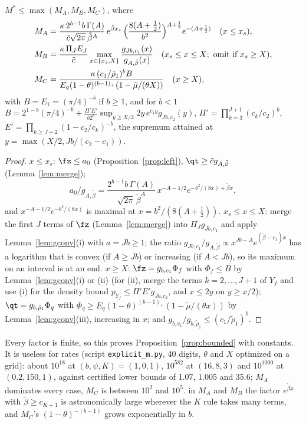 \begin{proposition}\label{prop:explicit}
$M^*\le\max(M_A,M_B,M_C)$, where
\begin{align*}
M_A&=\frac{\kappa\,2^{b-1}b\,\Gamma(A)}{\tilde c\sqrt{2\pi}\,\tilde\beta^A}\,e^{\tilde\beta x_s}\,
\Bigl(\frac{8(A+\frac12)}{b^2}\Bigr)^{A+\frac12}e^{-(A+\frac12)}\quad(x\le x_s),\\
M_B&=\frac{\kappa\,\Pi_JE_J}{\tilde c}\max_{x\in\{x_s,X\}}\frac{g_{Jb,c_1}(x)}{g_{A,\tilde\beta}(x)}\quad
(x_s\le x\le X;\ \text{omit if }x_s\ge X),\\
M_C&=\frac{\kappa\,(c_1/\tilde\rho_1)^bB}{E_q(1-\theta)^{(b-1)_+}(1-\tilde\mu/(\theta X))}\quad(x\ge X),
\end{align*}
with $B=E_1=(\pi/4)^{-b}$ if $b\ge1$, and for $b<1$ $B=2^{1-b}(\pi/4)^{-b}+\frac{\Pi'E'}{b2^b}
\sup_{y\ge X/2}2y\,e^{c_1y}g_{Jb,c_2}(y)$, $\Pi'=\prod_{k=3}^{J+1}(c_k/c_2)^b$,
$E'=\prod_{k\ge J+2}(1-c_2/c_k)^{-b}$, the supremum attained at $y=\max(X/2,Jb/(c_2-c_1))$.
\end{proposition}
\begin{proof}
$x\le x_s$: $\fz\le a_0$ (Proposition~\ref{prop:left}), $\qt\ge\tilde cg_{A,\tilde\beta}$ (Lemma~\ref{lem:merge});
\[a_0/g_{A,\tilde\beta}=\frac{2^{b-1}b\,\Gamma(A)}{\sqrt{2\pi}\,\tilde\beta^A}\,x^{-A-1/2}e^{-b^2/(8x)+\tilde\beta x},\]
and
$x^{-A-1/2}e^{-b^2/(8x)}$ is maximal at $x=b^2/(8(A+\frac12))$. $x_s\le x\le X$: merge the first $J$ terms of
$\fz$ (Lemma~\ref{lem:merge}) into $\Pi_Jg_{Jb,c_1}$ and apply Lemma~\ref{lem:gconv}(i) with $a=Jb\ge1$; the ratio
$g_{Jb,c_1}/g_{A,\tilde\beta}\propto x^{Jb-A}e^{(\tilde\beta-c_1)x}$ has a logarithm that is convex (if $A\ge Jb$)
or increasing (if $A<Jb$), so its maximum on an interval is at an end. $x\ge X$: $\fz=g_{b,c_1}\Phi_f$ with
$\Phi_f\le B$ by Lemma~\ref{lem:gconv}(i) or (ii) (for (ii), merge the terms $k=2,\dots,J+1$ of $Y_f$ and use (i)
for the density bound $p_{Y_f}\le\Pi'E'g_{Jb,c_2}$, and $x\le2y$ on $y\ge x/2$); $\qt=g_{b,\tilde\rho_1}\Phi_q$ with
$\Phi_q\ge E_q(1-\theta)^{(b-1)_+}(1-\tilde\mu/(\theta x))$ by Lemma~\ref{lem:gconv}(iii), increasing in $x$; and
$g_{b,c_1}/g_{b,\tilde\rho_1}\le(c_1/\tilde\rho_1)^b$.
\end{proof}
Every factor is finite, so this proves Proposition~\ref{prop:bounded} with constants. It is useless for rates
(script \texttt{explicit\_m.py}, 40 digits, $\theta$ and $X$ optimized on a grid): about $10^{18}$ at
$(b,\psi,K)=(1,0,1)$, $10^{582}$ at $(16,8,3)$ and $10^{1000}$ at $(0.2,150,1)$, against certified lower bounds of
1.07, 1.005 and 35.6; $M_A$ dominates every case, $M_C$ is between $10^2$ and $10^5$. in
$M_A$ and $M_B$ the factor $e^{\tilde\beta x}$ with $\tilde\beta\ge c_{K+1}$ is astronomically large wherever the
$K$ rule takes many terms, and $M_C$'s $(1-\theta)^{-(b-1)}$ grows exponentially in $b$.

